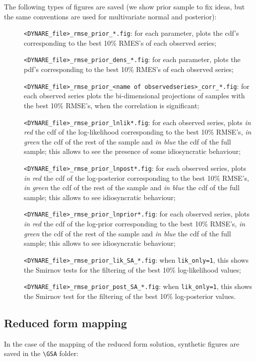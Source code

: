 \documentclass[12pt,a4paper]{article}
\begin{document}
The following types of figures are saved (we show prior sample to
fix ideas, but the same conventions are used for multivariate
normal and posterior):
\begin{description}
\item[]\verb"<DYNARE_file>_rmse_prior_*.fig": for each parameter, plots the cdf's
corresponding to the best 10\% RMES's of each observed series;
\item[]\verb"<DYNARE_file>_rmse_prior_dens_*.fig": for each parameter, plots the pdf's
corresponding to the best 10\% RMES's of each observed series;
\item[]\verb"<DYNARE_file>_rmse_prior_<name of observedseries>_corr_*.fig": for each observed series plots the
bi-dimensional projections of samples with the best 10\% RMSE's,
when the correlation is significant;
\item[]\verb"<DYNARE_file>_rmse_prior_lnlik*.fig": for each observed
series, plots \emph{in red} the cdf of the log-likelihood
corresponding to the best 10\% RMSE's, \emph{in green} the cdf of
the rest of the sample and \emph{in blue }the cdf of the full
sample; this allows to see the  presence of some idiosyncratic
behaviour;
\item[]\verb"<DYNARE_file>_rmse_prior_lnpost*.fig": for each observed
series, plots \emph{in red} the cdf of the log-posterior
corresponding to the best 10\% RMSE's, \emph{in green} the cdf of
the rest of the sample and \emph{in blue }the cdf of the full
sample; this allows to see idiosyncratic behaviour;
\item[]\verb"<DYNARE_file>_rmse_prior_lnprior*.fig": for each observed
series, plots \emph{in red} the cdf of the log-prior corresponding
to the best 10\% RMSE's, \emph{in green} the cdf of the rest of
the sample and \emph{in blue }the cdf of the full sample; this
allows to see idiosyncratic behaviour;
\item[]\verb"<DYNARE_file>_rmse_prior_lik_SA_*.fig": when
\verb"lik_only=1", this shows the Smirnov tests for the filtering
of the best 10\% log-likelihood values;
\item[]\verb"<DYNARE_file>_rmse_prior_post_SA_*.fig": when
\verb"lik_only=1", this shows the Smirnov test for the filtering
of the best 10\% log-posterior values.
\end{description}

\subsection{Reduced form mapping}
In the case of the mapping of the reduced form solution, synthetic
figures are saved in the \verb"\GSA" folder:
\end{document}
